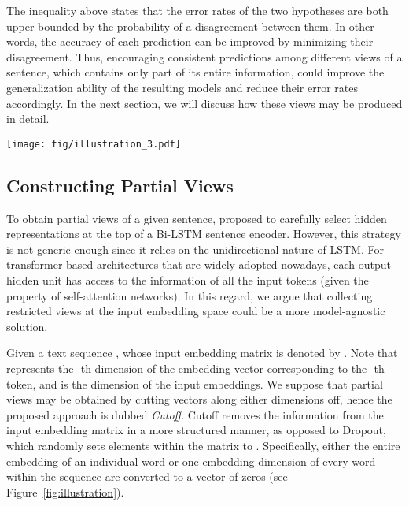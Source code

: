 \documentclass[11pt,a4paper]{article}
\begin{document}
The inequality above states that the error rates of the two hypotheses are both upper bounded by the probability of a disagreement between them. In other words, the accuracy of each prediction can be improved by minimizing their disagreement. Thus, encouraging consistent predictions among different views of a sentence, which contains only part of its entire information, could improve the generalization ability of the resulting models and reduce their error rates accordingly. In the next section, we will discuss how these views may be produced in detail. 
\begin{figure*}
	\centering
	\texttt{[image: fig/illustration\_3.pdf]} 
	\vspace{-4mm}
	\caption{Schematic illustration of the proposed cutoff augmentation strategies, including token cutoff, feature cutoff and span cutoff, respectively. Blue area indicates that the corresponding elements within the sentence's input embedding matrix are removed and converted to . Notably, this is distinct from Dropout, which randomly transforms elements to  (without considering any underlying structure of the matrix). }
	\label{fig:illustration}
	\vspace{-4mm}
\end{figure*}
\vspace{-4mm}
\subsection{Constructing Partial Views}
\vspace{-1mm}
To obtain partial views of a given sentence, \cite{Clark2018SemiSupervisedSM} proposed to carefully select hidden representations at the top of a Bi-LSTM sentence encoder. However, this strategy is not generic enough since it relies on the unidirectional nature of LSTM. For transformer-based architectures that are widely adopted nowadays, each output hidden unit has access to the information of all the input tokens (given the property of self-attention networks). In this regard, we argue that collecting restricted views at the input embedding space could be a more model-agnostic solution.

Given a text sequence , whose input embedding matrix is denoted by . Note that  represents the -th dimension of the embedding vector corresponding to the -th token, and  is the dimension of the input embeddings. 
We suppose that partial views may be obtained by cutting vectors along either dimensions off, hence the proposed approach is dubbed \emph{Cutoff}. 
Cutoff removes the information from the input embedding matrix in a more structured manner, as opposed to Dropout, which randomly sets elements within the matrix to .
Specifically, either the entire embedding of an individual word or one embedding dimension of every word within the sequence are converted to a vector of zeros (see Figure~\ref{fig:illustration}). 
\end{document}

